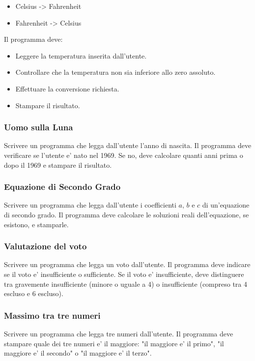 \documentclass[a4paper,12pt]{article}
\begin{document}
\begin{itemize}
	\item Celsius -> Fahrenheit
	\item Fahrenheit -> Celsius
\end{itemize}



Il programma deve:
\begin{itemize}
	\item Leggere la temperatura inserita dall’utente.
	\item Controllare che la temperatura non sia inferiore allo zero assoluto.
	\item Effettuare la conversione richiesta.
	\item Stampare il risultato.
\end{itemize}


\subsubsection{Uomo sulla Luna}
Scrivere un programma che legga dall'utente l'anno di nascita. 
Il programma deve verificare se l'utente e' nato nel 1969. 
Se no, deve calcolare quanti anni prima o dopo il 1969 e stampare il risultato.


\subsubsection{Equazione di Secondo Grado}
Scrivere un programma che legga dall'utente i coefficienti $a$, $b$ e $c$ di un'equazione di secondo grado. 
Il programma deve calcolare le soluzioni reali dell'equazione, se esistono, e stamparle.


	
\subsubsection{Valutazione del voto}
	
	Scrivere un programma che legga un voto dall'utente. 
	Il programma deve indicare se il voto e' insufficiente o sufficiente. 
	Se il voto e' insufficiente, deve distinguere tra gravemente insufficiente (minore o uguale a 4) o insufficiente (compreso tra 4 escluso e 6 escluso).
	
	
\subsubsection{Massimo tra tre numeri}

Scrivere un programma che legga tre numeri dall'utente. 
Il programma deve stampare quale dei tre numeri e' il maggiore: "il maggiore e' il primo", "il maggiore e' il secondo" o "il maggiore e' il terzo".
\end{document}
